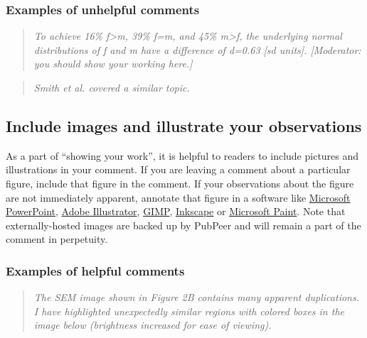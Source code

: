 \documentclass[letterpaper, 12pt]{article}
\begin{document}
\subsubsection*{Examples of unhelpful comments}

\begin{quote}
    \textit{To achieve 16\% f>m, 39\% f=m, and 45\% m>f, the underlying normal distributions of f and m have a difference of d=0.63 [sd units]. [Moderator: you should show your working here.]}
\end{quote}

\begin{quote}
    \textit{Smith et al. covered a similar topic.}
\end{quote}

\subsection*{Include images and illustrate your observations}

As a part of ``showing your work'', it is helpful to readers to include pictures and illustrations in your comment. If you are leaving a comment about a particular figure, include that figure in the comment. If your observations about the figure are not immediately apparent, annotate that figure in a software like \href{https://www.microsoft.com/en-us/microsoft-365/powerpoint}{Microsoft PowerPoint}, \href{https://www.adobe.com/products/illustrator/campaign/pricing.html?sdid=ZFN4FBV5&mv=search&mv2=paidsearch&ef_id=Cj0KCQjwveK4BhD4ARIsAKy6pMJu3V5UDkeG1YAb30o0_xHcccELpE4GbWbGDuP6PTULoRwr03lr0i0aAnYfEALw_wcB:G:s&s_kwcid=AL!3085!3!717388832858!e!!g!!adobe%20illustrator!1711729586!70905759510&gad_source=1&gclid=Cj0KCQjwveK4BhD4ARIsAKy6pMJu3V5UDkeG1YAb30o0_xHcccELpE4GbWbGDuP6PTULoRwr03lr0i0aAnYfEALw_wcB}{Adobe Illustrator}, \href{https://www.gimp.org/}{GIMP}, \href{https://inkscape.org/}{Inkscape} or \href{https://www.microsoft.com/en-us/windows/paint}{Microsoft Paint}. Note that externally-hosted images are backed up by PubPeer and will remain a part of the comment in perpetuity.

\subsubsection*{Examples of helpful comments}

\begin{quote}
    \textit{The SEM image shown in Figure 2B contains many apparent duplications. I have highlighted unexpectedly similar regions with colored boxes in the image below (brightness increased for ease of viewing).}
\end{quote}
\end{document}
